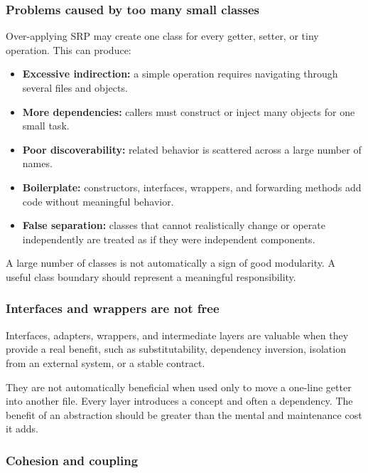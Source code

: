 \documentclass[12pt,a4paper]{article}
\begin{document}
\subsubsection{Problems caused by too many small classes}

Over-applying SRP may create one class for every getter, setter, or tiny operation. This can produce:

\begin{itemize}

\item \textbf{Excessive indirection:} a simple operation requires navigating through several files and objects.

\item \textbf{More dependencies:} callers must construct or inject many objects for one small task.

\item \textbf{Poor discoverability:} related behavior is scattered across a large number of names.

\item \textbf{Boilerplate:} constructors, interfaces, wrappers, and forwarding methods add code without meaningful behavior.

\item \textbf{False separation:} classes that cannot realistically change or operate independently are treated as if they were independent components.

\end{itemize}

A large number of classes is not automatically a sign of good modularity. A useful class boundary should represent a meaningful responsibility.

\subsubsection{Interfaces and wrappers are not free}

Interfaces, adapters, wrappers, and intermediate layers are valuable when they provide a real benefit, such as substitutability, dependency inversion, isolation from an external system, or a stable contract.

They are not automatically beneficial when used only to move a one-line getter into another file. Every layer introduces a concept and often a dependency. The benefit of an abstraction should be greater than the mental and maintenance cost it adds.

\subsubsection{Cohesion and coupling}
\end{document}
